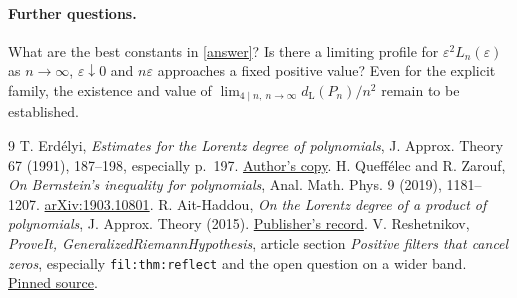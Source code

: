 \documentclass[11pt]{article}
\newcommand{\dd}{d_{\mathrm L}}
\begin{document}
\paragraph{Further questions.}
What are the best constants in \eqref{answer}? Is there a limiting profile for $\varepsilon^2L_n(\varepsilon)$ as $n\to\infty$, $\varepsilon\downarrow0$ and $n\varepsilon$ approaches a fixed positive value? Even for the explicit family, the existence and value of $\lim_{4\mid n,\ n\to\infty}\dd(P_n)/n^2$ remain to be established.

\begin{thebibliography}{9}
 T. Erd\'elyi, \emph{Estimates for the Lorentz degree of polynomials}, J. Approx. Theory 67 (1991), 187--198, especially p.~197. \href{https://people.tamu.edu/~terdelyi/papers-online/ELD.pdf}{Author's copy}.
 H. Queff\'elec and R. Zarouf, \emph{On Bernstein's inequality for polynomials}, Anal. Math. Phys. 9 (2019), 1181--1207. \href{https://arxiv.org/abs/1903.10801}{arXiv:1903.10801}.
 R. Ait-Haddou, \emph{On the Lorentz degree of a product of polynomials}, J. Approx. Theory (2015). \href{https://www.sciencedirect.com/science/article/pii/S0021904514001816}{Publisher's record}.
 V. Reshetnikov, \emph{ProveIt, GeneralizedRiemannHypothesis}, article section \emph{Positive filters that cancel zeros}, especially \texttt{fil:thm:reflect} and the open question on a wider band. \href{https://github.com/VladimirReshetnikov/ProveIt/blob/41a284d6ef8eb16d783bfc685ab99cc6e1d28daa/Analysis/GeneralizedRiemannHypothesis/Article/sections/fil.tex}{Pinned source}.
\end{thebibliography}
\end{document}
